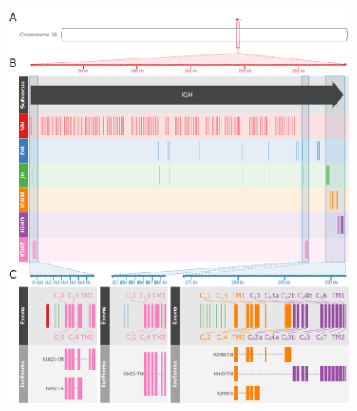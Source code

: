 	\begin{figure}
	\centering
	\includegraphics[width=\textwidth]{_Figures/png/xma-new-locus-map}
	\caption[The immunoglobulin heavy chain (\textit{IGH}) locus in \xma]{\textbf{The immunoglobulin heavy chain (\textit{IGH}) locus in \textit{Xiphophorus maculatus}:} (A) Position of the \textit{IGH} locus on chromosome (group) 16 of the \Xma genome. (B) Arrangement of \vh, \dh, \jh and constant-region gene segments on the \Xma \igh{} locus. (C) Detailed map of the ,  and  constant regions, indicating the position and identity of the constant-region exons and the exon composition of expressed \igh{} isoforms in \Xma. Note change of orientation between subfigures (A) and (B-C).}
	\begin{subfigure}{0em}
        \label{fig:xma-locus-map-a}
    \end{subfigure}
    \begin{subfigure}{0em}
        \label{fig:xma-locus-map-b}
    \end{subfigure}
    \begin{subfigure}{0em}
        \label{fig:xma-locus-map-c}
    \end{subfigure}
	\label{fig:xma-locus-map}
\end{figure} %

